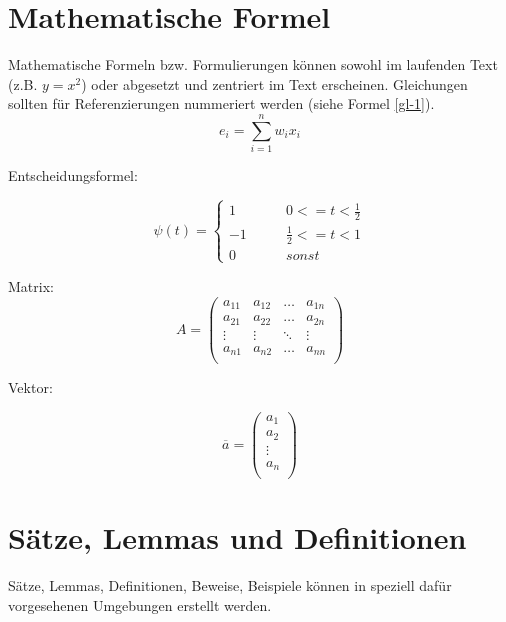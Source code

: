 \section{Mathematische Formel}
Mathematische Formeln bzw. Formulierungen können sowohl im
laufenden Text (z.B. $y=x^2$) oder abgesetzt und zentriert im Text
erscheinen. Gleichungen sollten für Referenzierungen nummeriert
werden (siehe Formel \ref{gl-1}).
\begin{equation}
\label{gl-1}
e_{i}=\sum _{i=1}^{n}w_{i}x_{i}
\end{equation}

Entscheidungsformel:

\begin{equation}
\psi(t)=\left\{\begin{array}{ccc}
1 &  \qquad 0 <= t < \frac{1}{2} \\
-1 &  \qquad \frac{1}{2} <= t <1 \\
0 & \qquad sonst
\end{array} \right.
\end{equation}


Matrix:
\begin{equation}
A = \left(
\begin{array}{llll}
a_{11} & a_{12} & \ldots & a_{1n} \\
a_{21} & a_{22} & \ldots & a_{2n} \\
\vdots & \vdots & \ddots & \vdots \\
a_{n1} & a_{n2} & \ldots & a_{nn} \\
\end{array}
\right)
\end{equation}

Vektor: 

\begin{equation}
\overline{a} = \left(
\begin{array}{c}
a_{1}\\
a_{2}\\
\vdots\\
a_{n}\\
\end{array}
\right)
\end{equation}

\section{Sätze, Lemmas und Definitionen}

Sätze, Lemmas, Definitionen, Beweise, Beispiele können in speziell dafür vorgesehenen Umgebungen erstellt werden.


